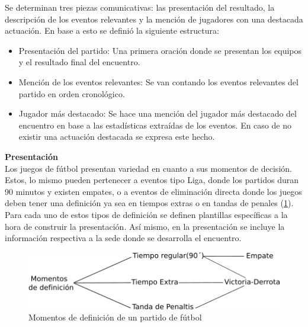 
    Se determinan tres piezas comunicativas: las presentación del resultado, la descripción de los eventos relevantes y 
la mención de jugadores con una destacada actuación. En base a esto se definió la siguiente estructura:

\begin{itemize}
    \item Presentación del partido: Una primera oración donde se presentan los equipos y el resultado final del encuentro.
    \item Mención de los eventos relevantes: Se van contando los eventos relevantes del partido en orden cronol\'ogico.
    \item Jugador más destacado: Se hace una mención del jugador más destacado del encuentro en base a las estadísticas extraídas de los 
    eventos. En caso de no existir una actuación destacada se expresa este hecho.
\end{itemize}


    \textbf{Presentación}\\

    Los juegos de fútbol presentan variedad en cuanto a sus momentos de decisión. Estos, lo mismo pueden pertenecer a eventos tipo Liga, donde los partidos 
duran 90 minutos y existen empates, o a eventos de eliminación directa donde los juegos deben tener una definición ya sea en tiempos extras 
o en tandas de penales (\ref{fig_momentos_definicion}). Para cada uno de estos tipos de 
definición se definen plantillas específicas a la hora de construir la presentación. Así mismo, en la presentación se incluye la información 
respectiva a la sede donde se desarrolla el encuentro.\\

    \begin{figure}[!]
        \begin{center}
            \includegraphics[scale=1]{Graphics/momentodef.png}
        \end{center}
        \caption{Momentos de definición de un partido de fútbol}
        \label{fig_momentos_definicion}
    \end{figure}

